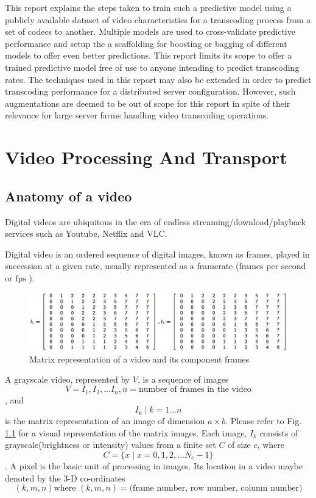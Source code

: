 \documentclass[letterpaper,12pt,titlepage,oneside,final]{report}
\newcommand{\mtext}[1]{
    $\text{#1}$
}
\begin{document}
        This report explains the steps taken to train such a predictive model using a publicly available dataset of video characteristics for a transcoding process from a set of codecs to another. Multiple models are used to cross-validate predictive performance and setup the a scaffolding for boosting or bagging of different models to offer even better predictions. This report limits its scope to offer a trained predictive model free of use to anyone intending to predict transcoding rates. The techniques used in this report may also be extended in order to predict transcoding performance for a distributed server configuration. However, such augmentations are deemed to be out of scope for this report in spite of their relevance for large server farms handling video transcoding operations.

\chapter{Video Processing And Transport}
    
    \section{Anatomy of a video}
        Digital videos are ubiquitous in the era of endless streaming/download/playback services such as Youtube, Netflix and VLC.
        
        Digital video is an ordered sequence of digital images, known as frames, played in succession at a given rate, usually represented as a framerate (frames per second or\mtext{fps}). 
        
        \begin{figure}[!h]
            \centering
            \includegraphics[width=\textwidth]{vidarch}
            \caption{Matrix representation of a video and its component frames}
            \label{vidarch}
        \end{figure}
        
        A grayscale video, represented by $V$, is a sequence of images $$ V = I_1, I_2, ... I_n, n = \text{number of frames in the video}$$, and $$I_k \mid k=1...n$$ is the matrix representation of an image of dimension $a \times b$. Please refer to Fig. \ref{vidarch} for a visual representation of the matrix images. Each image, $I_k$ consists of grayscale(brightness or intensity) values from a finite set $C$ of size $c$, where $$C = \{x \mid x = 0, 1, 2, ...N_c -1\}$$. A pixel is the basic unit of processing in images. Its location in a video maybe denoted by the 3-D co-ordinates 
        $$(k, m, n) \text{where } (k, m, n) = \text{(frame number, row number, column number)}$$
        
\end{document}
